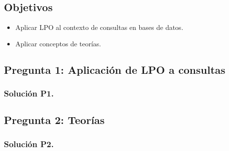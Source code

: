 \documentclass{article}
\begin{document}
\subsection*{Objetivos}
\begin{itemize}
    \item Aplicar LPO al contexto de consultas en bases de datos.
    \item Aplicar conceptos de teorías.
\end{itemize}

\subsection*{Pregunta 1: Aplicación de LPO a consultas}

\subsubsection*{Solución P1.}

\newpage

\subsection*{Pregunta 2: Teorías}

\subsubsection*{Solución P2.}

\end{document}
